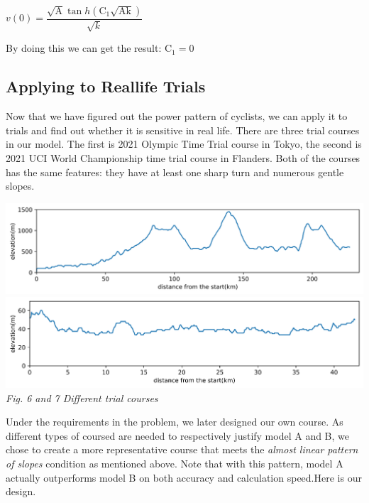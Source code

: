 \documentclass[12pt]{article}
\theoremstyle{definition}
\theoremstyle{remark}
\numberwithin{equation}{section}
\begin{document}
	$v(0)=\dfrac{\sqrt{\mathrm{A}} \tan h \left(\mathrm{C}_1\sqrt{\mathrm{Ak}}\right)}{\sqrt{ k }}$

	By doing this we can get the result: $\mathrm{C}_1=0$
	\subsection{Applying to Reallife Trials}
	Now that we have figured out the power pattern of cyclists, we can apply it to trials and find out whether it is sensitive in real life. There are three trial courses in our model. The first is 2021 Olympic Time Trial course in Tokyo, the second is 2021 UCI World Championship time trial course in Flanders. Both of the courses has the same features: they have at least one sharp turn and numerous gentle slopes.

	\begin{center}
		\includegraphics[width=15cm]{6.png}\\
		\includegraphics[width=15cm]{7.png}\\
		\small \textit{Fig. 6 and 7  Different trial courses}
	\end{center}
	Under the requirements in the problem, we later designed our own course. As different types of coursed are needed to respectively justify model A and B, we chose to create a more representative course that meets the \textit{almost linear pattern of slopes} condition as mentioned above. Note that with this pattern, model A actually outperforms model B on both accuracy and calculation speed.Here is our design.
\end{document}
